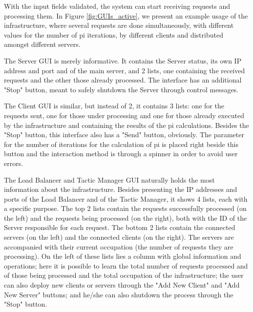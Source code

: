 \documentclass[12pt]{article}
\begin{document}
With the input fields validated, the system can start receiving requests and processing them.
In Figure \ref{fig:GUIs_active}, we present an example usage of the infrastructure, where several requests are done simultaneously, with different values for the
number of pi iterations, by different clients and distributed amongst different servers.

The Server GUI is merely informative.
It contains the Server status, its own IP address and port and of the main server, and 2 lists, one containing the received requests and the other those
already processed.
The interface has an additional "Stop" button, meant to safely shutdown the Server through control messages.

The Client GUI is similar, but instead of 2, it contains 3 lists: one for the requests sent, one for those under processing and one for those already
executed by the infrastructure and containing the results of the pi calculations.
Besides the "Stop" button, this interface also has a "Send" button, obviously.
The parameter for the number of iterations for the calculation of pi is placed right beside this button and the interaction method is through a spinner in order
to avoid user errors.

The Load Balancer and Tactic Manager GUI naturally holds the most information about the infrastructure.
Besides presenting the IP addresses and ports of the Load Balancer and of the Tactic Manager, it shows 4 lists, each with a specific purpose.
The top 2 lists contain the requests successfully processed (on the left) and the requests being processed (on the right), both with the ID of the Server
responsible for each request.
The bottom 2 lists contain the connected servers (on the left) and the connected clients (on the right).
The servers are accompanied with their current occupation (the number of requests they are processing).
On the left of these lists lies a column with global information and operations; here it is possible to learn the total number of requests processed and of
those being processed and the total occupation of the infrastructure; the user can also deploy new clients or servers through the "Add New Client" and "Add New
Server" buttons; and he/she can also shutdown the process through the "Stop" button.
\end{document}
